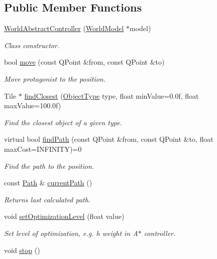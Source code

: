 \subsection*{Public Member Functions}
\begin{DoxyCompactItemize}
\item 
\hyperlink{classWorldAbstractController_a8f4be5436078c93733197d76809df45c}{World\+Abstract\+Controller} (\hyperlink{classWorldModel}{World\+Model} $\ast$model)
\begin{DoxyCompactList}\small\item\em Class constructor. \end{DoxyCompactList}\item 
bool \hyperlink{classWorldAbstractController_a6fdee5689b6fd4b2e8f69d26c0181840}{move} (const Q\+Point \&from, const Q\+Point \&to)
\begin{DoxyCompactList}\small\item\em Move protagonist to the position. \end{DoxyCompactList}\item 
Tile $\ast$ \hyperlink{classWorldAbstractController_ac5789c244d880519632c14c073773389}{find\+Closest} (\hyperlink{worldabstractcontroller_8h_a842c5e2e69277690b064bf363c017980}{Object\+Type} type, float min\+Value=0.\+0f, float max\+Value=100.\+0f)
\begin{DoxyCompactList}\small\item\em Find the closest object of a given type. \end{DoxyCompactList}\item 
virtual bool \hyperlink{classWorldAbstractController_a7716b59b6e3cbd086485e7012ae7d4f0}{find\+Path} (const Q\+Point \&from, const Q\+Point \&to, float max\+Cost=I\+N\+F\+I\+N\+I\+TY)=0
\begin{DoxyCompactList}\small\item\em Find the path to the position. \end{DoxyCompactList}\item 
const \hyperlink{structPath}{Path} \& \hyperlink{classWorldAbstractController_ad3c7531df375e1a5b97e0532acb9c28e}{current\+Path} ()\hypertarget{classWorldAbstractController_ad3c7531df375e1a5b97e0532acb9c28e}{}\label{classWorldAbstractController_ad3c7531df375e1a5b97e0532acb9c28e}

\begin{DoxyCompactList}\small\item\em Returns last calculated path. \end{DoxyCompactList}\item 
void \hyperlink{classWorldAbstractController_ad7c83b4de6ee365ef241c0755faa6e0d}{set\+Optimization\+Level} (float value)
\begin{DoxyCompactList}\small\item\em Set level of optimization, e.\+g. h weight in A$\ast$ controller. \end{DoxyCompactList}\item 
void \hyperlink{classWorldAbstractController_a803d78a89d8aa8644e6755d86cb55a5f}{stop} ()\hypertarget{classWorldAbstractController_a803d78a89d8aa8644e6755d86cb55a5f}{}\label{classWorldAbstractController_a803d78a89d8aa8644e6755d86cb55a5f}


\end{DoxyCompactItemize}
